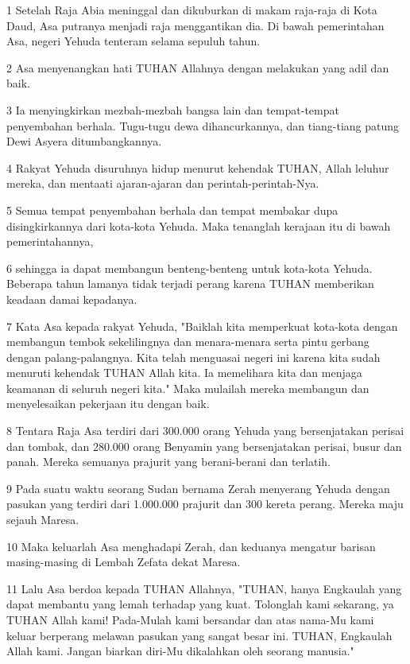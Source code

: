 \par 1 Setelah Raja Abia meninggal dan dikuburkan di makam raja-raja di Kota Daud, Asa putranya menjadi raja menggantikan dia. Di bawah pemerintahan Asa, negeri Yehuda tenteram selama sepuluh tahun.
\par 2 Asa menyenangkan hati TUHAN Allahnya dengan melakukan yang adil dan baik.
\par 3 Ia menyingkirkan mezbah-mezbah bangsa lain dan tempat-tempat penyembahan berhala. Tugu-tugu dewa dihancurkannya, dan tiang-tiang patung Dewi Asyera ditumbangkannya.
\par 4 Rakyat Yehuda disuruhnya hidup menurut kehendak TUHAN, Allah leluhur mereka, dan mentaati ajaran-ajaran dan perintah-perintah-Nya.
\par 5 Semua tempat penyembahan berhala dan tempat membakar dupa disingkirkannya dari kota-kota Yehuda. Maka tenanglah kerajaan itu di bawah pemerintahannya,
\par 6 sehingga ia dapat membangun benteng-benteng untuk kota-kota Yehuda. Beberapa tahun lamanya tidak terjadi perang karena TUHAN memberikan keadaan damai kepadanya.
\par 7 Kata Asa kepada rakyat Yehuda, "Baiklah kita memperkuat kota-kota dengan membangun tembok sekelilingnya dan menara-menara serta pintu gerbang dengan palang-palangnya. Kita telah menguasai negeri ini karena kita sudah menuruti kehendak TUHAN Allah kita. Ia memelihara kita dan menjaga keamanan di seluruh negeri kita." Maka mulailah mereka membangun dan menyelesaikan pekerjaan itu dengan baik.
\par 8 Tentara Raja Asa terdiri dari 300.000 orang Yehuda yang bersenjatakan perisai dan tombak, dan 280.000 orang Benyamin yang bersenjatakan perisai, busur dan panah. Mereka semuanya prajurit yang berani-berani dan terlatih.
\par 9 Pada suatu waktu seorang Sudan bernama Zerah menyerang Yehuda dengan pasukan yang terdiri dari 1.000.000 prajurit dan 300 kereta perang. Mereka maju sejauh Maresa.
\par 10 Maka keluarlah Asa menghadapi Zerah, dan keduanya mengatur barisan masing-masing di Lembah Zefata dekat Maresa.
\par 11 Lalu Asa berdoa kepada TUHAN Allahnya, "TUHAN, hanya Engkaulah yang dapat membantu yang lemah terhadap yang kuat. Tolonglah kami sekarang, ya TUHAN Allah kami! Pada-Mulah kami bersandar dan atas nama-Mu kami keluar berperang melawan pasukan yang sangat besar ini. TUHAN, Engkaulah Allah kami. Jangan biarkan diri-Mu dikalahkan oleh seorang manusia."
